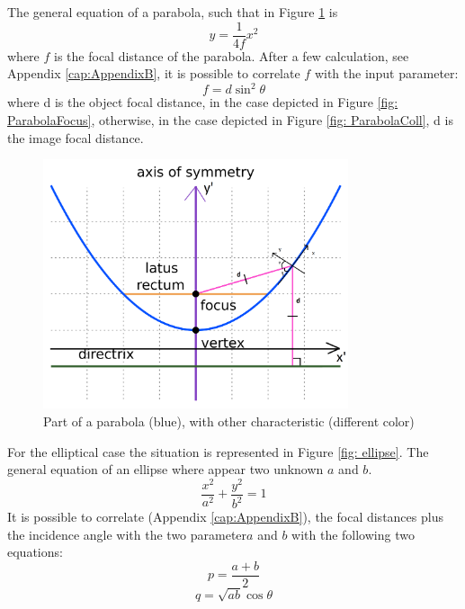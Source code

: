The general equation of a parabola, such that in  Figure \ref{fig: ParabolaSystem} is
%
\begin{equation}
y = \frac{1}{4f} x^2
\label{eq: parabola}
\end{equation}
%
where $f $ is the focal distance of the parabola. After a few calculation, see Appendix \ref{cap:AppendixB}, it is possible to correlate $f $ with the input parameter:
%
\begin{equation}
f = d \sin^2 \theta
\label{eq: parabola2}
\end{equation}
%
where d is the object focal distance, in the case depicted in Figure \ref{fig: ParabolaFocus}, otherwise, in the case depicted in Figure \ref{fig: ParabolaColl}, d is the image focal distance.
%
\begin{figure}[H]
%
\centering
%
\includegraphics[width=0.8\textwidth]{Immagini/Chapter3/Parab}
%
\caption{Part of a parabola (blue), with other characteristic (different color) \cite{wikiParabola}}
%
\label{fig: ParabolaSystem}
%
\end{figure}
For the elliptical case the situation is represented in Figure \ref{fig: ellipse}. The general equation of an ellipse where appear two unknown $a$ and $b $.
%
\begin{equation}
\frac{x^2}{a^2} + \frac{y^2}{b^2} = 1
\label{eq: ellipse}
\end{equation}
%
It is possible to correlate (Appendix \ref{cap:AppendixB}), the focal distances plus the incidence angle with the two parameter$a$ and $b $ with the following two equations:
%
\begin{equation}
p = \frac{a + b}{2}
\label{eq: 1stEllipseEq}
\end{equation}
%
\begin{equation}
q = \sqrt{ab} \cos\theta
\label{eq: 2ndEllipseEq}
\end{equation}
